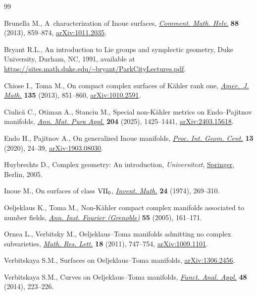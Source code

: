 \begin{thebibliography}{99}
\footnotesize\itemsep=0pt

Brunella M., A~characterization of {I}noue surfaces,
 \href{https://doi.org/10.4171/CMH/305}{\textit{Comment. Math. Helv.}}
 \textbf{88} (2013), 859--874,
 \href{http://arxiv.org/abs/1011.2035}{arXiv:1011.2035}.

Bryant R.L., An introduction to Lie groups and symplectic geometry, Duke
 University, Durham, NC, 1991, available at
 \url{https://sites.math.duke.edu/~bryant/ParkCityLectures.pdf}.

Chiose I., Toma M., On compact complex surfaces of {K}\"ahler rank one,
 \href{https://doi.org/10.1353/ajm.2013.0022}{\textit{Amer.~J. Math.}}
 \textbf{135} (2013), 851--860,
 \href{http://arxiv.org/abs/1010.2591}{arXiv:1010.2591}.

Ciulic\u{a} C., Otiman A., Stanciu M., Special non-{K}\"ahler metrics on
 {E}ndo--{P}ajitnov manifolds,
 \href{https://doi.org/10.1007/s10231-024-01533-0}{\textit{Ann. Mat. Pura
 Appl.}} \textbf{204} (2025), 1425--1441,
 \href{http://arxiv.org/abs/2403.15618}{arXiv:2403.15618}.

Endo H., Pajitnov A., On generalized {I}noue manifolds,
 \href{https://doi.org/10.15673/tmgc.v13i4.1748}{\textit{Proc. Int. Geom.
 Cent.}} \textbf{13} (2020), 24--39,
 \href{http://arxiv.org/abs/1903.08030}{arXiv:1903.08030}.

Huybrechts D., Complex geometry: {A}n introduction, \textit{Universitext},
 \href{https://doi.org/10.1007/b137952}{Springer}, Berlin, 2005.

Inoue M., On surfaces of class {${\rm VII}_{0}$},
 \href{https://doi.org/10.1007/BF01425563}{\textit{Invent. Math.}} \textbf{24}
 (1974), 269--310.

Oeljeklaus K., Toma M., Non-{K}\"ahler compact complex manifolds associated to
 number fields, \href{https://doi.org/10.5802/aif.2093}{\textit{Ann. Inst.
 Fourier (Grenoble)}} \textbf{55} (2005), 161--171.

Ornea L., Verbitsky M., Oeljeklaus--{T}oma manifolds admitting no complex
 subvarieties,
 \href{https://doi.org/10.4310/MRL.2011.v18.n4.a12}{\textit{Math. Res. Lett.}}
 \textbf{18} (2011), 747--754,
 \href{http://arxiv.org/abs/1009.1101}{arXiv:1009.1101}.

Verbitskaya S.M., Surfaces on {O}eljeklaus--{T}oma manifolds,
 \href{http://arxiv.org/abs/1306.2456}{arXiv:1306.2456}.

Verbitskaya S.M., Curves on {O}eljeklaus--{T}oma manifolds,
 \href{https://doi.org/10.1007/s10688-014-0063-y}{\textit{Funct. Anal. Appl.}}
 \textbf{48} (2014), 223--226.

\end{thebibliography}
